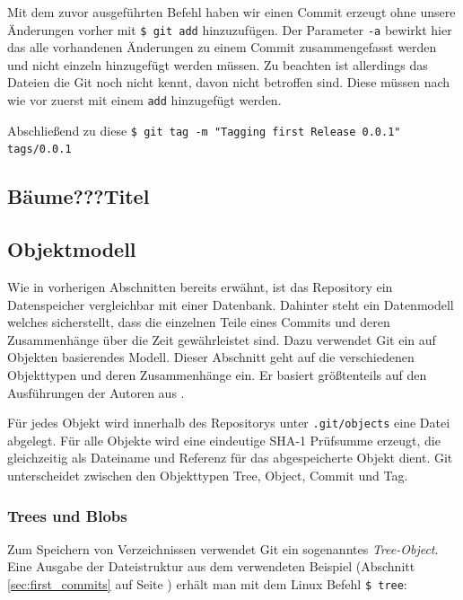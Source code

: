 

Mit dem zuvor ausgeführten Befehl haben wir einen Commit erzeugt ohne unsere
Änderungen vorher mit \texttt{\$ git add} hinzuzufügen. Der Parameter
\texttt{-a} bewirkt hier das alle vorhandenen Änderungen zu einem Commit
zusammengefasst werden und nicht einzeln hinzugefügt werden müssen. Zu beachten
ist allerdings das Dateien die Git noch nicht kennt, davon nicht betroffen
sind. Diese müssen nach wie vor zuerst mit einem \texttt{add} hinzugefügt
werden.

Abschließend zu diese \texttt{\$ git tag -m "Tagging first Release 0.0.1"
tags/0.0.1}

\subsection{Bäume???Titel}\label{sec:trees}
\subsection{Objektmodell}\label{objectmodel}
Wie in vorherigen Abschnitten bereits erwähnt, ist das Repository ein
Datenspeicher vergleichbar mit einer Datenbank. Dahinter steht ein Datenmodell
welches sicherstellt, dass die einzelnen Teile eines Commits und deren
Zusammenhänge über die Zeit gewährleistet sind. Dazu verwendet Git ein auf
Objekten basierendes Modell. Dieser Abschnitt geht auf die verschiedenen
Objekttypen und deren Zusammenhänge ein. Er basiert größtenteils auf den
Ausführungen der Autoren aus \cite[S.~49-59]{gitosp}.

Für jedes Objekt wird innerhalb des Repositorys unter \texttt{.git/objects}
eine Datei abgelegt. Für alle Objekte wird eine eindeutige \gls{SHA-1}
Prüfsumme erzeugt, die gleichzeitig als Dateiname und Referenz für das
abgespeicherte Objekt dient. Git unterscheidet zwischen den Objekttypen Tree,
Object, Commit und Tag.

\subsubsection{Trees und Blobs}\label{sec:treeblobobjects}
Zum Speichern von Verzeichnissen verwendet Git ein sogenanntes
\textit{Tree-Object}. Eine Ausgabe der Dateistruktur aus dem verwendeten
Beispiel (Abschnitt \ref{sec:first_commits} auf Seite
\pageref{sec:first_commits}) erhält man mit dem Linux Befehl \texttt{\$ tree}:

